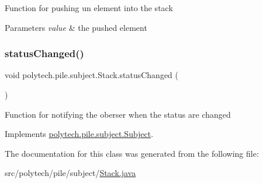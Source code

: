 Function for pushing un element into the stack


\begin{DoxyParams}{Parameters}
{\em value} & the pushed element \\
\hline
\end{DoxyParams}
\hypertarget{classpolytech_1_1pile_1_1subject_1_1_stack_a350f674a71cae9fce7eca5488af074e5}{}\label{classpolytech_1_1pile_1_1subject_1_1_stack_a350f674a71cae9fce7eca5488af074e5} 
\subsubsection{\texorpdfstring{status\+Changed()}{statusChanged()}}
{\footnotesize\ttfamily void polytech.\+pile.\+subject.\+Stack.\+status\+Changed (\begin{DoxyParamCaption}{ }\end{DoxyParamCaption})}

Function for notifying the oberser when the status are changed 

Implements \hyperlink{interfacepolytech_1_1pile_1_1subject_1_1_subject_a9bc972b992f152734a3b40cda13dc4d7}{polytech.\+pile.\+subject.\+Subject}.



The documentation for this class was generated from the following file\+:\begin{DoxyCompactItemize}
\item 
src/polytech/pile/subject/\hyperlink{_stack_8java}{Stack.\+java}\end{DoxyCompactItemize}
